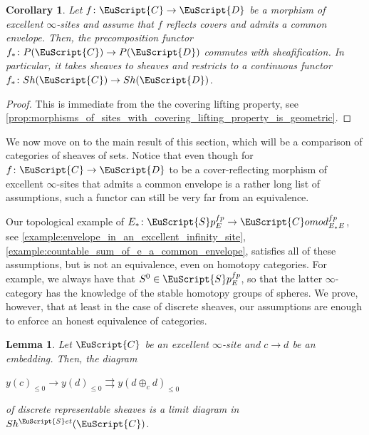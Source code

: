 \documentclass[oneside,a4paper]{amsart}
\newcommand{\euscr}[1]{\EuScript{#1}} %
\newcommand{\ccat}{\euscr{C}} %
\newcommand{\dcat}{\euscr{D}} %
\newcommand{\spectra}{\euscr{S}p} %
\newcommand{\sets}{\euscr{S}et} %
\newcommand{\Comod}{\euscr{C}omod} %
\newcommand{\ComodE}{\Comod_{E_{*}E}} %
\theoremstyle{plain}
\newtheorem{lemma}[thm]{Lemma}
\newtheorem{cor}[thm]{Corollary}
\theoremstyle{definition}
\theoremstyle{remark}
\begin{document}
\begin{cor}
\label{cor:precomposition_along_a_morphism_of_excellents_sites_with_common_envelope_commutes_with_shafification}
Let $f \colon \ccat \rightarrow \dcat$ be a morphism of excellent $\infty$-sites and assume that $f$ reflects covers and admits a common envelope. Then, the precomposition functor $f_{*} \colon P(\ccat) \rightarrow P(\dcat)$ commutes with sheafification. In particular, it takes sheaves to sheaves and restricts to a continuous functor $f_{*} \colon Sh(\ccat) \rightarrow Sh(\dcat)$.
\end{cor}

\begin{proof}
This is immediate from the the covering lifting property, see \cref{prop:morphisms_of_sites_with_covering_lifting_property_is_geometric}.
\end{proof}

We now move on to the main result of this section, which will be a comparison of categories of sheaves of sets. Notice that even though for $f \colon \ccat \rightarrow \dcat$ to be a cover-reflecting morphism of excellent $\infty$-sites that admits a common envelope is a rather long list of assumptions, such a functor can still be very far from an equivalence. 

Our topological example of $E_{*} \colon \spectra_{E}^{fp} \rightarrow \ComodE^{fp}$, see \cref{example:envelope_in_an_excellent_infinity_site}, \cref{example:countable_sum_of_e_a_common_envelope}, satisfies all of these assumptions, but is not an equivalence, even on homotopy categories. For example, we always have that $S^{0} \in \spectra_{E}^{fp}$, so that the latter $\infty$-category has the knowledge of the stable homotopy groups of spheres. We prove, however, that at least in the case of discrete sheaves, our assumptions are enough to enforce an honest equivalence of categories. 

\begin{lemma}
\label{lemma:descent_for_injections}
Let $\ccat$ be an excellent $\infty$-site and $c \rightarrow d$ be an embedding. Then, the diagram 

\begin{center}
$y(c)_{\leq 0} \rightarrow y(d) _{\leq 0} \rightrightarrows y(d \oplus _{c} d) _{\leq 0}$
\end{center}
of discrete representable sheaves is a limit diagram in $Sh^{\sets}(\ccat)$. 
\end{lemma}
\end{document}
